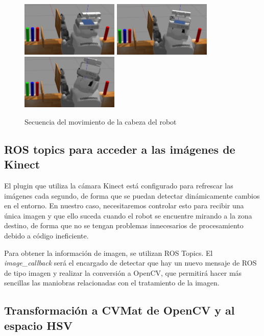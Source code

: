 \documentclass[12pt,spanish,chapterprefix, numbers=noenddot]{book}
\numberwithin{equation}{section}
\numberwithin{figure}{section}
\begin{document}
\begin{figure}[hbt!]
\centering
\includegraphics[width=4.66cm]{Figs/fase1_1.png}
\includegraphics[width=4.66cm]{Figs/fase1_2.png}
\includegraphics[width=4.66cm]{Figs/fase1_4.png}
\par
\caption{\label{fig:cuello}Secuencia del movimiento de la cabeza del robot}
\end{figure}

\subsection{ROS topics para acceder a las imágenes de Kinect} 

El plugin que utiliza la cámara Kinect está configurado para refrescar las imágenes cada segundo, de forma que se puedan detectar dinámicamente cambios en el entorno.
En nuestro caso, necesitaremos controlar esto para recibir una única imagen y que ello suceda cuando el robot se encuentre mirando a la zona destino, de forma que no se tengan problemas innecesarios de procesamiento debido a código ineficiente.

Para obtener la información de imagen, se utilizan ROS Topics. El \textit{image\_callback} será el encargado de detectar que hay un nuevo mensaje de ROS de tipo imagen y realizar la conversión a OpenCV, que permitirá hacer más sencillas las maniobras relacionadas con el tratamiento de la imagen.

\subsection{Transformación a CVMat de OpenCV y al espacio HSV}
\end{document}
